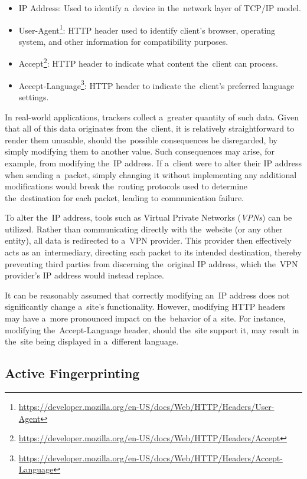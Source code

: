 \begin{itemize}
    \item IP Address: Used to identify a~device in the~network layer of TCP/IP model.
    \item User-Agent\footnote{\url{https://developer.mozilla.org/en-US/docs/Web/HTTP/Headers/User-Agent}}: HTTP header used to identify client's browser, operating system, and other information for compatibility purposes.
    \item Accept\footnote{\url{https://developer.mozilla.org/en-US/docs/Web/HTTP/Headers/Accept}}: HTTP header to indicate what content the~client can process.
    \item Accept-Language\footnote{\url{https://developer.mozilla.org/en-US/docs/Web/HTTP/Headers/Accept-Language}}: HTTP header to indicate the~client's preferred language settings.
\end{itemize}


In real-world applications, trackers collect a~greater quantity of such data. Given that all of this data originates from the~client, it is relatively straightforward to render them unusable, should the~possible consequences be disregarded, by simply modifying them to another value. Such consequences may arise, for example, from modifying the~IP address. If a~client were to alter their IP address when sending a~packet, simply changing it without implementing any additional modifications would break the~routing protocols used to determine the~destination for each packet, leading to communication failure. 

To alter the~IP address, tools such as Virtual Private Networks (\textit{VPNs}) \cite{avast-vpn-working} can be utilized. Rather than communicating directly with the~website (or any other entity), all data is redirected to a~VPN provider. This provider then effectively acts as an~intermediary, directing each packet to its intended destination, thereby preventing third parties from discerning the~original IP address, which the~VPN provider's IP address would instead replace.

It can be reasonably assumed that correctly modifying an~IP address does not significantly change a~site's functionality. However, modifying HTTP headers may have a~more pronounced impact on the~behavior of a~site. For instance, modifying the~Accept-Language header, should the~site support it, may result in the~site being displayed in a~different language. 

\subsection{Active Fingerprinting}

